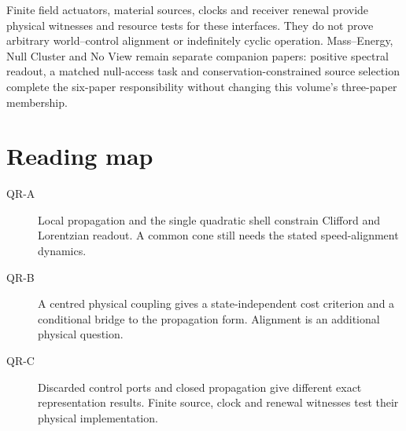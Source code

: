\documentclass[11pt,a4paper]{article}
\begin{document}
Finite field actuators, material sources, clocks and receiver renewal provide physical witnesses and resource tests for these interfaces. They do not prove arbitrary world--control alignment or indefinitely cyclic operation. Mass--Energy, Null Cluster and No View remain separate companion papers: positive spectral readout, a matched null-access task and conservation-constrained source selection complete the six-paper responsibility without changing this volume's three-paper membership.

\section*{Reading map}
\begin{description}
\item[QR-A] Local propagation and the single quadratic shell constrain Clifford and Lorentzian readout. A common cone still needs the stated speed-alignment dynamics.
\item[QR-B] A centred physical coupling gives a state-independent cost criterion and a conditional bridge to the propagation form. Alignment is an additional physical question.
\item[QR-C] Discarded control ports and closed propagation give different exact representation results. Finite source, clock and renewal witnesses test their physical implementation.
\end{description}
\end{document}
